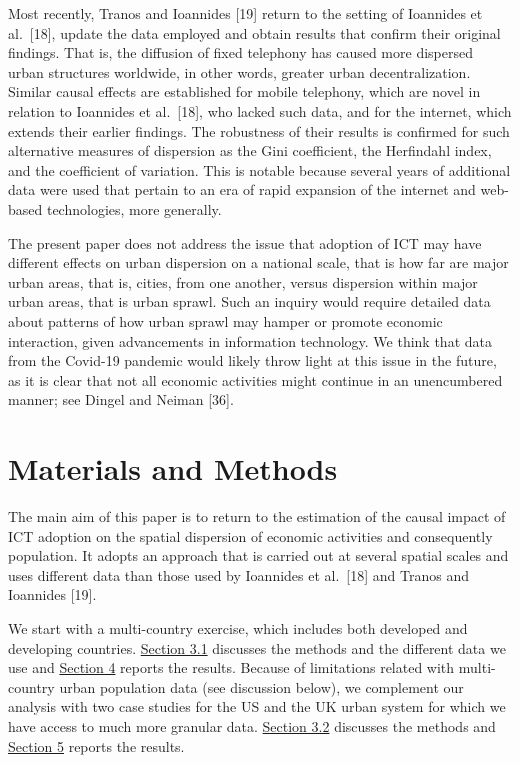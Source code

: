 \documentclass[10pt,letterpaper]{article}
\begin{document}
Most recently, Tranos and Ioannides {[}19{]} return to the setting of
Ioannides et al.~{[}18{]}, update the data employed and obtain results
that confirm their original findings. That is, the diffusion of fixed
telephony has caused more dispersed urban structures worldwide, in other
words, greater urban decentralization. Similar causal effects are
established for mobile telephony, which are novel in relation to
Ioannides et al.~{[}18{]}, who lacked such data, and for the internet,
which extends their earlier findings. The robustness of their results is
confirmed for such alternative measures of dispersion as the Gini
coefficient, the Herfindahl index, and the coefficient of variation.
This is notable because several years of additional data were used that
pertain to an era of rapid expansion of the internet and web-based
technologies, more generally.

The present paper does not address the issue that adoption of ICT may
have different effects on urban dispersion on a national scale, that is
how far are major urban areas, that is, cities, from one another, versus
dispersion within major urban areas, that is urban sprawl. Such an
inquiry would require detailed data about patterns of how urban sprawl
may hamper or promote economic interaction, given advancements in
information technology. We think that data from the Covid-19 pandemic
would likely throw light at this issue in the future, as it is clear
that not all economic activities might continue in an unencumbered
manner; see Dingel and Neiman {[}36{]}. \color{black}

\hypertarget{sec3}{%
\section{Materials and Methods}\label{sec3}}

The main aim of this paper is to return to the estimation of the causal
impact of ICT adoption on the spatial dispersion of economic activities
and consequently population. It adopts an approach that is carried out
at several spatial scales and uses different data than those used by
Ioannides et al.~{[}18{]} and Tranos and Ioannides {[}19{]}.

We start with a multi-country exercise, which includes both developed
and developing countries. \protect\hyperlink{sec3.1}{Section 3.1}
discusses the methods and the different data we use and
\protect\hyperlink{sec4}{Section 4} reports the results. Because of
limitations related with multi-country urban population data (see
discussion below), we complement our analysis with two case studies for
the US and the UK urban system for which we have access to much more
granular data. \protect\hyperlink{sec3.2}{Section 3.2} discusses the
methods and \protect\hyperlink{sec5}{Section 5} reports the results.
\end{document}
